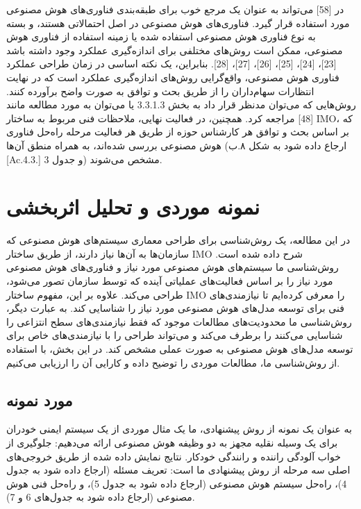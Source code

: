 \documentclass[a4paper,10pt]{article}
\begin{document}
در [58] می‌تواند به عنوان یک مرجع خوب برای طبقه‌بندی فناوری‌های هوش مصنوعی مورد استفاده قرار گیرد. فناوری‌های هوش مصنوعی در اصل احتمالاتی هستند، و بسته به نوع فناوری هوش مصنوعی استفاده شده یا زمینه استفاده از فناوری هوش مصنوعی، ممکن است روش‌های مختلفی برای اندازه‌گیری عملکرد وجود داشته باشد [23]، [24]، [25]، [26]، [27]، [28]. بنابراین، یک نکته اساسی در زمان طراحی عملکرد فناوری هوش مصنوعی، واقع‌گرایی روش‌های اندازه‌گیری عملکرد است که در نهایت انتظارات سهام‌داران را از طریق بحث و توافق به صورت واضح برآورده کنند. روش‌هایی که می‌توان مدنظر قرار داد به بخش 3.3.1.3 یا می‌توان به مورد مطالعه مانند [48] مراجعه کرد. همچنین، در فعالیت نهایی، ملاحظات فنی مربوط به ساختار IMO، که بر اساس بحث و توافق هر کارشناس حوزه از طریق هر فعالیت مرحله راه‌حل فناوری هوش مصنوعی بررسی شده‌اند، به همراه منطق آن‌ها (ارجاع داده شود به شکل ۸.ب [Ac.4.3.] و جدول 3) مشخص می‌شوند.

                    
    \section{نمونه موردی و تحلیل اثربخشی}

        در این مطالعه، یک روش‌شناسی برای طراحی معماری سیستم‌های هوش مصنوعی که سازمان‌ها به آن‌ها نیاز دارند، از طریق ساختار IMO شرح داده شده است. روش‌شناسی ما سیستم‌های هوش مصنوعی مورد نیاز و فناوری‌های هوش مصنوعی مورد نیاز را بر اساس فعالیت‌های عملیاتی آینده که توسط سازمان تصور می‌شود، طراحی می‌کند. علاوه بر این، مفهوم ساختار IMO را معرفی کرده‌ایم تا نیازمندی‌های فنی برای توسعه مدل‌های هوش مصنوعی مورد نیاز را شناسایی کند. به عبارت دیگر، روش‌شناسی ما محدودیت‌های مطالعات موجود که فقط نیازمندی‌های سطح انتزاعی را شناسایی می‌کنند را برطرف می‌کند و می‌تواند طراحی را با نیازمندی‌های خاص برای توسعه مدل‌های هوش مصنوعی به صورت عملی مشخص کند. در این بخش، با استفاده از روش‌شناسی ما، مطالعات موردی را توضیح داده و کارایی آن را ارزیابی می‌کنیم.

        \subsection{مورد نمونه}

            به عنوان یک نمونه از روش پیشنهادی، ما یک مثال موردی از یک سیستم ایمنی خودران برای یک وسیله نقلیه مجهز به دو وظیفه هوش مصنوعی ارائه می‌دهیم: جلوگیری از خواب آلودگی راننده و رانندگی خودکار. نتایج نمایش داده شده از طریق خروجی‌های اصلی سه مرحله از روش پیشنهادی ما است: تعریف مسئله (ارجاع داده شود به جدول 4)، راه‌حل سیستم هوش مصنوعی (ارجاع داده شود به جدول 5)، و راه‌حل فنی هوش مصنوعی (ارجاع داده شود به جدول‌های 6 و 7).
\end{document}
